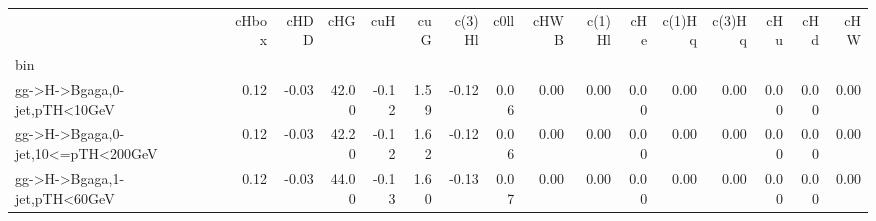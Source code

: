 

\begin{tabular}{lrrrrrrrrrrrrrrr}
\toprule
 & cHbox & cHDD & cHG & cuH & cuG & c(3)Hl & c0ll & cHWB & c(1)Hl & cHe & c(1)Hq & c(3)Hq & cHu & cHd & cHW \\
bin &  &  &  &  &  &  &  &  &  &  &  &  &  &  &  \\
\midrule
gg->H->Bgaga,0-jet,pTH<10GeV & {\cellcolor[HTML]{E4E5F0}} \color[HTML]{000000} 0.12 & {\cellcolor[HTML]{F8F4EE}} \color[HTML]{000000} -0.03 & {\cellcolor[HTML]{2D004B}} \color[HTML]{F1F1F1} 42.00 & {\cellcolor[HTML]{FBEAD2}} \color[HTML]{000000} -0.12 & {\cellcolor[HTML]{2D004B}} \color[HTML]{F1F1F1} 1.59 & {\cellcolor[HTML]{FBEAD2}} \color[HTML]{000000} -0.12 & {\cellcolor[HTML]{EEEEF3}} \color[HTML]{000000} 0.06 & {\cellcolor[HTML]{F6F6F7}} \color[HTML]{000000} 0.00 & {\cellcolor[HTML]{F6F6F7}} \color[HTML]{000000} 0.00 & {\cellcolor[HTML]{F6F6F7}} \color[HTML]{000000} 0.00 & {\cellcolor[HTML]{F6F6F7}} \color[HTML]{000000} 0.00 & {\cellcolor[HTML]{F6F6F7}} \color[HTML]{000000} 0.00 & {\cellcolor[HTML]{F6F6F7}} \color[HTML]{000000} 0.00 & {\cellcolor[HTML]{F6F6F7}} \color[HTML]{000000} 0.00 & {\cellcolor[HTML]{F6F6F7}} \color[HTML]{000000} 0.00 \\
gg->H->Bgaga,0-jet,10<=pTH<200GeV & {\cellcolor[HTML]{E4E5F0}} \color[HTML]{000000} 0.12 & {\cellcolor[HTML]{F8F4EE}} \color[HTML]{000000} -0.03 & {\cellcolor[HTML]{2D004B}} \color[HTML]{F1F1F1} 42.20 & {\cellcolor[HTML]{FBE9CF}} \color[HTML]{000000} -0.12 & {\cellcolor[HTML]{2D004B}} \color[HTML]{F1F1F1} 1.62 & {\cellcolor[HTML]{FBE9CF}} \color[HTML]{000000} -0.12 & {\cellcolor[HTML]{EEEEF3}} \color[HTML]{000000} 0.06 & {\cellcolor[HTML]{F6F6F7}} \color[HTML]{000000} 0.00 & {\cellcolor[HTML]{F6F6F7}} \color[HTML]{000000} 0.00 & {\cellcolor[HTML]{F6F6F7}} \color[HTML]{000000} 0.00 & {\cellcolor[HTML]{F6F6F7}} \color[HTML]{000000} 0.00 & {\cellcolor[HTML]{F6F6F7}} \color[HTML]{000000} 0.00 & {\cellcolor[HTML]{F6F6F7}} \color[HTML]{000000} 0.00 & {\cellcolor[HTML]{F6F6F7}} \color[HTML]{000000} 0.00 & {\cellcolor[HTML]{F6F6F7}} \color[HTML]{000000} 0.00 \\
gg->H->Bgaga,1-jet,pTH<60GeV & {\cellcolor[HTML]{E4E5F0}} \color[HTML]{000000} 0.12 & {\cellcolor[HTML]{F8F3EC}} \color[HTML]{000000} -0.03 & {\cellcolor[HTML]{2D004B}} \color[HTML]{F1F1F1} 44.00 & {\cellcolor[HTML]{FCE8CD}} \color[HTML]{000000} -0.13 & {\cellcolor[HTML]{2D004B}} \color[HTML]{F1F1F1} 1.60 & {\cellcolor[HTML]{FCE8CD}} \color[HTML]{000000} -0.13 & {\cellcolor[HTML]{EDEDF3}} \color[HTML]{000000} 0.07 & {\cellcolor[HTML]{F6F6F7}} \color[HTML]{000000} 0.00 & {\cellcolor[HTML]{F6F6F7}} \color[HTML]{000000} 0.00 & {\cellcolor[HTML]{F6F6F7}} \color[HTML]{000000} 0.00 & {\cellcolor[HTML]{F6F6F7}} \color[HTML]{000000} 0.00 & {\cellcolor[HTML]{F6F6F7}} \color[HTML]{000000} 0.00 & {\cellcolor[HTML]{F6F6F7}} \color[HTML]{000000} 0.00 & {\cellcolor[HTML]{F6F6F7}} \color[HTML]{000000} 0.00 & {\cellcolor[HTML]{F6F6F7}} \color[HTML]{000000} 0.00 \\

\end{tabular}
